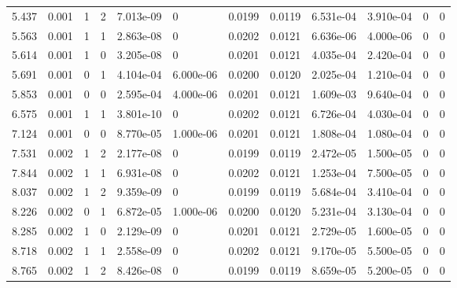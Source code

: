 \documentclass[preview]{standalone}
\begin{document}
{{\begin{tabular}{L{1.2cm}C{1.2cm} C{0.3cm}C{0.5cm} C{1.4cm}C{1.4cm} C{1.4cm}C{1.4cm} C{1.6cm}C{1.6cm} C{1.6cm}C{1.6cm}}
  5.437  &  0.001  & 1     &  2 &  7.013e-09  & 0  &  0.0199&   0.0119& 6.531e-04 & 3.910e-04   &  0 & 0  \\ 
  5.563  &  0.001  & 1     &  1 &  2.863e-08  & 0  &  0.0202&   0.0121& 6.636e-06 & 4.000e-06   &  0 & 0  \\ 
  5.614  &  0.001  & 1     &  0 &  3.205e-08  & 0  &  0.0201&   0.0121& 4.035e-04 & 2.420e-04   &  0 & 0  \\ 
  5.691  &  0.001  & 0     &  1 &  4.104e-04  & 6.000e-06  &  0.0200&   0.0120& 2.025e-04 & 1.210e-04   &  0 & 0  \\ 
  5.853  &  0.001  & 0     &  0 &  2.595e-04  & 4.000e-06  &  0.0201&   0.0121& 1.609e-03 & 9.640e-04   &  0 & 0  \\ 
  6.575  &  0.001  & 1     &  1 &  3.801e-10  & 0  &  0.0202&   0.0121& 6.726e-04 & 4.030e-04   &  0 & 0  \\ 
  7.124  &  0.001  & 0     &  0 &  8.770e-05  & 1.000e-06  &  0.0201&   0.0121& 1.808e-04 & 1.080e-04   &  0 & 0  \\ 
  7.531  &  0.002  & 1     &  2 &  2.177e-08  & 0  &  0.0199&   0.0119& 2.472e-05 & 1.500e-05   &  0 & 0  \\ 
  7.844  &  0.002  & 1     &  1 &  6.931e-08  & 0  &  0.0202&   0.0121& 1.253e-04 & 7.500e-05   &  0 & 0  \\ 
  8.037  &  0.002  & 1     &  2 &  9.359e-09  & 0  &  0.0199&   0.0119& 5.684e-04 & 3.410e-04   &  0 & 0  \\ 
  8.226  &  0.002  & 0     &  1 &  6.872e-05  & 1.000e-06  &  0.0200&   0.0120& 5.231e-04 & 3.130e-04   &  0 & 0  \\ 
  8.285  &  0.002  & 1     &  0 &  2.129e-09  & 0  &  0.0201&   0.0121& 2.729e-05 & 1.600e-05   &  0 & 0  \\ 
  8.718  &  0.002  & 1     &  1 &  2.558e-09  & 0  &  0.0202&   0.0121& 9.170e-05 & 5.500e-05   &  0 & 0  \\ 
  8.765  &  0.002  & 1     &  2 &  8.426e-08  & 0  &  0.0199&   0.0119& 8.659e-05 & 5.200e-05   &  0 & 0  \\ 
\hline 
\end{tabular} 

}}
\end{document}
